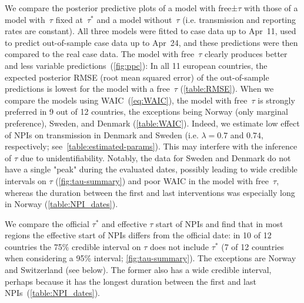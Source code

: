 \documentclass[12pt]{extarticle}
\begin{document}
We compare the posterior predictive plots of a model with  free±$\tau$ with those of a model with~$\tau$ fixed at~$\tau^*$ and a model without~$\tau$ (i.e. transmission and reporting rates are constant).
All three models were fitted to case data up to Apr~11, used to predict out-of-sample case data up to Apr~24, and these predictions were then compared to the real case data. 
The model with free~$\tau$ clearly produces better and less variable predictions~(\autoref{fig:ppc}):
In all 11 european countries, the expected posterior RMSE (root mean squared error) of the out-of-sample predictions is lowest for the model with a free~$\tau$ (\autoref{table:RMSE}).
When we compare the models using WAIC~(\autoref{eq:WAIC}), the model with free~$\tau$ is strongly preferred in 9 out of 12 countries, the exceptions being Norway (only marginal preference), Sweden, and Denmark (\autoref{table:WAIC}).
Indeed, we estimate low effect of NPIs on transmission in Denmark and Sweden (i.e. $\lambda=0.7$ and $0.74$, respectively; see~\autoref{table:estimated-params}).
This may interfere with the inference of $\tau$ due to unidentifiability. 
Notably, the data for Sweden and Denmark do not have a single "peak" during the evaluated dates, possibly leading to wide credible intervals on $\tau$ (\autoref{fig:tau-summary}) and poor WAIC in the model with free~$\tau$, whereas the duration between the first and last interventions was especially long in Norway (\autoref{table:NPI_dates}).

We compare the official $\tau^*$ and effective $\tau$ start of NPIs and find that in most regions the effective start of NPIs differs from the official date: in 10 of 12 countries the 75\% credible interval on $\tau$ does not include $\tau^*$ (7 of 12 countries when considering a 95\% interval; \autoref{fig:tau-summary}).
The exceptions are Norway and Switzerland (see below).
The former also has a wide credible interval, perhaps because it has the longest duration between the first and last NPIs~(\autoref{table:NPI_dates}).
\end{document}
